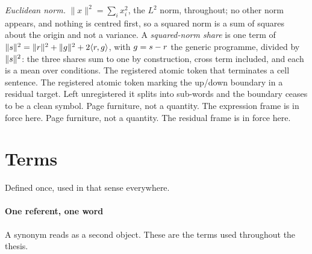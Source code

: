 \begin{description}[labelwidth=5em, leftmargin=6em, labelsep=0.6em,
                    style=multiline, font=\normalfont, itemsep=0.5ex]
 \emph{Euclidean norm.} $\lVert x\rVert^{2}
  = \sum_i x_i^{2}$, the $L^{2}$ norm, throughout; no other norm appears, and
  nothing is centred first, so a squared norm is a sum of squares about the
  origin and not a variance. A \emph{squared-norm share} is one term of
  $\lVert s\rVert^{2} = \lVert r\rVert^{2} + \lVert g\rVert^{2}
  + 2\langle r,g\rangle$, with $g = s - r$ the generic programme,
  divided by $\lVert s\rVert^{2}$: the three shares sum to one by
  construction, cross term included, and each is a mean over conditions.
 The registered atomic token that terminates a cell
  sentence.
 The registered atomic token marking the up\slash down
  boundary in a residual target. Left unregistered it splits into sub-words and
  the boundary ceases to be a clean symbol.
 Page furniture, not a quantity. The expression frame
  is in force here.
 Page furniture, not a quantity. The residual frame is
  in force here.
\end{description}

\section*{Terms}

\noindent
Defined once, used in that sense everywhere.

\paragraph{One referent, one word} A synonym reads as a second object. These
are the terms used throughout the thesis.

